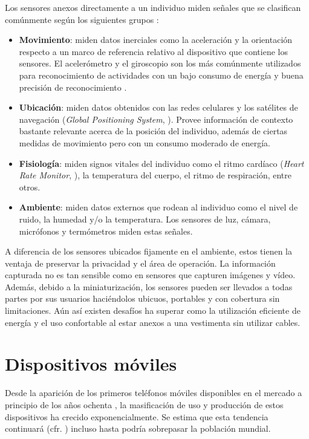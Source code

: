 Los sensores anexos directamente a un individuo miden señales que
se clasifican comúnmente según los siguientes grupos \cite{LaraLabrador2013}:
\begin{itemize}
\item \textbf{Movimiento}: miden datos inerciales como la aceleración y
la orientación respecto a un marco de referencia relativo al dispositivo
que contiene los sensores. El acelerómetro y el giroscopio son los
más comúnmente utilizados para reconocimiento de actividades con un
bajo consumo de energía y buena precisión de reconocimiento \cite{Bao2004,LaraLabrador2012}.
\item \textbf{Ubicación}: miden datos obtenidos con las redes celulares
 y los satélites de navegación (\emph{Global Positioning
System}, ). Provee información de contexto bastante relevante
acerca de la posición del individuo, además de ciertas medidas de
movimiento pero con un consumo moderado de energía.
\item \textbf{Fisiología}: miden signos vitales del individuo como el ritmo
cardíaco (\emph{Heart Rate Monitor},\emph{ }), la temperatura
del cuerpo, el ritmo de respiración, entre otros.
\item \textbf{Ambiente}: miden datos externos que rodean al individuo como
el nivel de ruido, la humedad y/o la temperatura. Los sensores de
luz, cámara, micrófonos y termómetros miden estas señales. 
\end{itemize}
A diferencia de los sensores ubicados fijamente en el ambiente, estos
tienen la ventaja de preservar la privacidad y el área de operación.
La información capturada no es tan sensible como en sensores que capturen
imágenes y vídeo. Además, debido a la miniaturización, los sensores
pueden ser llevados a todas partes por sus usuarios haciéndolos ubicuos,
portables y con cobertura sin limitaciones. Aún así existen desafíos
ha superar como la utilización eficiente de energía y el uso confortable
al estar anexos a una vestimenta sin utilizar cables.

\section{Dispositivos móviles}

\label{sec24:dispositivos-moviles} Desde la aparición de los primeros
teléfonos móviles disponibles en el mercado a principio de los años
ochenta \cite{Tanenbaum2010}, la masificación de uso y producción
de estos dispositivos ha crecido exponencialmente. Se estima que esta
tendencia continuará (cfr. \cite{Ekholm2011}) incluso hasta podría
sobrepasar la población mundial.

